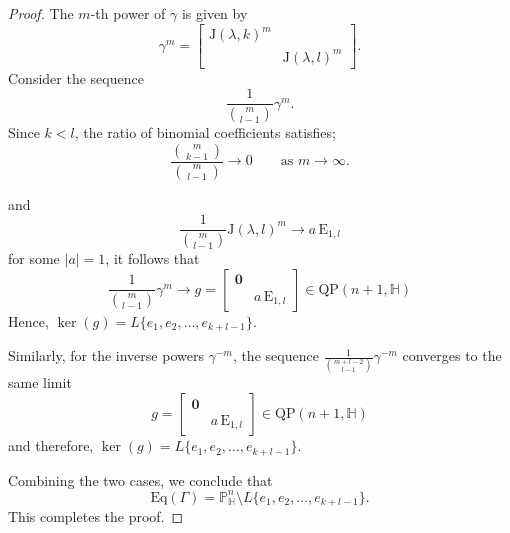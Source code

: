 \documentclass[10pt,a4paper]{amsart}
\def\H{\mathbb H}
\def\P{\mathbb P}
\begin{document}
\begin{proof}
The $m$-th power of $\gamma$ is given by
\[
\gamma^m =
\begin{bmatrix}
    \mathrm{J}(\lambda, k)^m & \\
    & \mathrm{J}(\lambda, l)^m
\end{bmatrix}.
\]
Consider the sequence
\[
\frac{1}{{m \choose l - 1}} \gamma^m.
\]
Since \(k < l\), the ratio of binomial coefficients satisfies;
\[
\frac{\binom{m}{\,k-1\,}}{\binom{m}{\,l-1\,}} \longrightarrow 0 
\qquad \text{as } m \to \infty.
\]

and 
\[
\frac{1}{{m \choose l - 1}} \mathrm{J}(\lambda, l)^m \longrightarrow a\,\mathrm{E}_{1,l}
\]
for some $|a| = 1$, it follows that
\[
\frac{1}{{m \choose l - 1}} \gamma^m \longrightarrow
g =
\begin{bmatrix}
    \mathbf{0} & \\
    & a\,\mathrm{E}_{1,l}
\end{bmatrix}  \in \mathrm{QP}(n+1,\mathbb{H})
\]
Hence,
$\ker(g) = L\{ e_1, e_2, \ldots, e_{k+l-1} \}.$


Similarly, for the inverse powers $\gamma^{-m}$, the sequence
$\frac{1}{{m + l - 2 \choose l - 1}} \gamma^{-m}$
converges to the same limit
\[
g =
\begin{bmatrix}
    \mathbf{0} & \\
    & a\,\mathrm{E}_{1,l}
\end{bmatrix} \in \mathrm{QP}(n+1,\mathbb{H})
\]
and therefore,
$\ker(g) = L\{ e_1, e_2, \ldots, e_{k+l-1} \}.$


Combining the two cases, we conclude that
\[
\mathrm{Eq}(\Gamma) =  \P^n_\H\setminus L\{ e_1, e_2, \ldots, e_{k+l-1} \} .
\]
This completes the proof. 
\end{proof}
\end{document}
